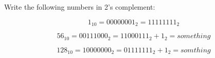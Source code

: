 

Write the following numbers in 2's complement:


\[ 1_{10} = 00000001_2  = 11111111_2\]

\[56_{10} = 00111000_2 = 11000111_2 + 1_2 = something\]

\[128_{10} = 10000000_2 = 01111111_2 + 1_2 = somthing\]



